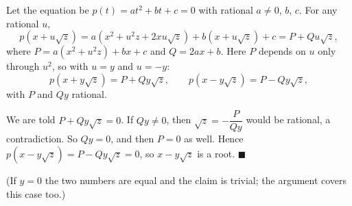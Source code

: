 Let the equation be $p(t)=at^2+bt+c=0$ with rational $a\ne0$, $b$, $c$. For any rational $u$,
\[
p\!\left(x+u\sqrt z\right)=a\left(x^2+u^2z+2xu\sqrt z\right)+b\left(x+u\sqrt z\right)+c=P+Q u\sqrt z,
\]
where $P=a(x^2+u^2z)+bx+c$ and $Q=2ax+b$. Here $P$ depends on $u$ only through $u^2$, so with $u=y$ and $u=-y$:
\[
p(x+y\sqrt z)=P+Qy\sqrt z,\qquad p(x-y\sqrt z)=P-Qy\sqrt z ,
\]
with $P$ and $Qy$ rational.

We are told $P+Qy\sqrt z=0$. If $Qy\ne0$, then $\sqrt z=-\dfrac{P}{Qy}$ would be rational, a contradiction. So $Qy=0$, and then $P=0$ as well. Hence $p(x-y\sqrt z)=P-Qy\sqrt z=0$, so $x-y\sqrt z$ is a root. $\blacksquare$

(If $y=0$ the two numbers are equal and the claim is trivial; the argument covers this case too.)
